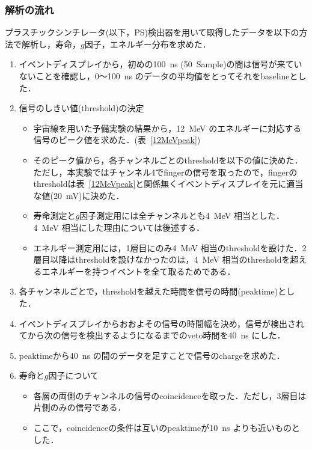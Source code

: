   \subsubsection{解析の流れ}
  プラスチックシンチレータ(以下，PS)検出器を用いて取得したデータを以下の方法で解析し，寿命，$g$因子，エネルギー分布を求めた．
  \begin{enumerate}
   \item イベントディスプレイから，初めの100~ns (50~Sample)の間は信号が来ていないことを確認し，0〜100~ns のデータの平均値をとってそれをbaselineとした．
   \item 信号のしきい値(threshold)の決定
	 \begin{itemize}
	  \item 宇宙線を用いた予備実験の結果から，12~MeV のエネルギーに対応する信号のピーク値を求めた．(表~\ref{12MeVpeak})%
	  \item そのピーク値から，各チャンネルごとのthresholdを以下の値に決めた．
		ただし，本実験ではチャンネル4でfingerの信号を取ったので，fingerのthresholdは表~\ref{12MeVpeak}と関係無くイベントディスプレイを元に適当な値(20~mV)に決めた．
	  \item 寿命測定と$g$因子測定用には全チャンネルとも4~MeV 相当とした．4~MeV 相当にした理由については後述する．
	  \item エネルギー測定用には，1層目にのみ4~MeV 相当のthresholdを設けた．2層目以降はthresholdを設けなかったのは，4~MeV 相当のthresholdを超えるエネルギーを持つイベントを全て取るためである．
	 \end{itemize}
   \item 各チャンネルごとで，thresholdを越えた時間を信号の時間(peaktime)とした．
   \item イベントディスプレイからおおよその信号の時間幅を決め，信号が検出されてから次の信号を検出するようになるまでのveto時間を40~ns にした．
   \item peaktimeから40~ns の間のデータを足すことで信号のchargeを求めた．
   \item 寿命と$g$因子について
	 \begin{itemize}
	  \item 各層の両側のチャンネルの信号のcoincidenceを取った．ただし，3層目は片側のみの信号である．
	  \item ここで，coincidenceの条件は互いのpeaktimeが10~ns よりも近いものとした．

\end{itemize}
\end{enumerate}
